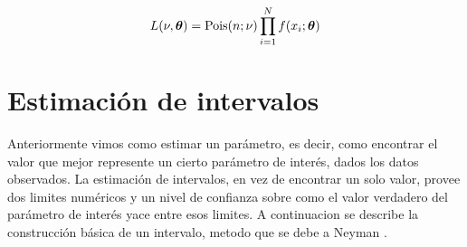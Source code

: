 \begin{equation}
  L(\nu,\bm{\theta}) = \operatorname{Pois}(n;\nu) \prod_{i=1}^{N} f(x_i; \bm{\theta})
\end{equation}

\section{Estimación de intervalos}

Anteriormente vimos como estimar un parámetro, es decir, como encontrar el
valor que mejor represente un cierto parámetro de interés, dados los datos
observados. La estimación de intervalos, en vez de encontrar un solo valor,
provee dos limites numéricos y un nivel de confianza sobre como el valor
verdadero del parámetro de interés yace entre esos limites. A continuacion
se describe la construcción básica de un intervalo, metodo que se debe a
Neyman .








